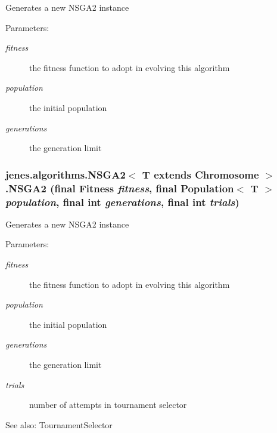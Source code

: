 Generates a new NSGA2 instance 

\begin{Desc}
\item[Parameters:]
\begin{description}
\item[{\em fitness}]the fitness function to adopt in evolving this algorithm \item[{\em population}]the initial population \item[{\em generations}]the generation limit \end{description}
\end{Desc}
\hypertarget{classjenes_1_1algorithms_1_1_n_s_g_a2_3_01_t_01extends_01_chromosome_01_4_c0873ceec23f2908e64650b2e0f2b62a}{
\subsubsection[NSGA2]{\setlength{\rightskip}{0pt plus 5cm}jenes.algorithms.NSGA2$<$ T extends Chromosome $>$.NSGA2 (final Fitness {\em fitness}, \/  final Population$<$ T $>$ {\em population}, \/  final int {\em generations}, \/  final int {\em trials})}}
\label{classjenes_1_1algorithms_1_1_n_s_g_a2_3_01_t_01extends_01_chromosome_01_4_c0873ceec23f2908e64650b2e0f2b62a}


Generates a new NSGA2 instance 

\begin{Desc}
\item[Parameters:]
\begin{description}
\item[{\em fitness}]the fitness function to adopt in evolving this algorithm \item[{\em population}]the initial population \item[{\em generations}]the generation limit \item[{\em trials}]number of attempts in tournament selector \end{description}
\end{Desc}
\begin{Desc}
\item[See also:]TournamentSelector \end{Desc}


